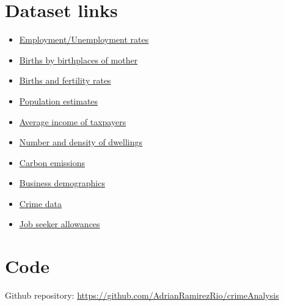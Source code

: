 \documentclass[12pt, openany]{report}
\begin{document}
\begin{appendices}
\chapter{Dataset links}
\begin{itemize}
\item \href{https://data.london.gov.uk/dataset/economic-activity-rate-employment-rate-and-unemployment-rate-ethnic-group-national/}{Employment/Unemployment rates}
\item \href{https://data.london.gov.uk/dataset/births-birthplace-mother-borough/}{Births by birthplaces of mother}
\item \href{https://data.london.gov.uk/dataset/births-and-fertility-rates-borough/}{Births and fertility rates}
\item 
\href{https://data.london.gov.uk/dataset/office-national-statistics-ons-population-estimates-borough}{Population estimates}
\item \href{https://data.london.gov.uk/dataset/average-income-tax-payers-borough/}{Average income of taxpayers}
\item \href{https://data.london.gov.uk/dataset/number-and-density-of-dwellings-by-borough/}{Number and density of dwellings}
\item \href{https://data.london.gov.uk/dataset/carbon-dioxide-emissions-borough/}{Carbon emissions}
\item \href{https://data.london.gov.uk/dataset/business-demographics-and-survival-rates-borough/}{Business demographics}
\item \href{http://maps.met.police.uk/tables.htm}{Crime data}
\item \href{https://data.london.gov.uk/dataset/job-seekers-allowance-claimants-borough/}{Job seeker allowances}
\end{itemize}

\chapter{Code}
\label{appendix:code}

Github repository: \url{https://github.com/AdrianRamirezRio/crimeAnalysis}      

\end{appendices}


\end{document}
